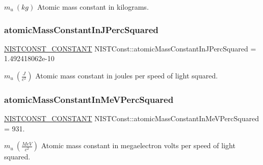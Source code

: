 $m_u \ (kg)$ Atomic mass constant in kilograms. \mbox{\label{group___n_i_s_t_const-_atomic_mass_constant_ga2e051baa0d89927080288e2289ac0346}} 
\subsubsection{\texorpdfstring{atomic\+Mass\+Constant\+In\+J\+Perc\+Squared}{atomicMassConstantInJPercSquared}}
{\footnotesize\ttfamily \mbox{\hyperlink{_n_i_s_t_const_8hpp_a2b0fc1d7452373f816175dd86ce26729}{N\+I\+S\+T\+C\+O\+N\+S\+T\+\_\+\+C\+O\+N\+S\+T\+A\+NT}} N\+I\+S\+T\+Const\+::atomic\+Mass\+Constant\+In\+J\+Perc\+Squared = 1.\+492418062e-\/10}

$m_u \ (\frac{J}{c^2})$ Atomic mass constant in joules per speed of light squared. \mbox{\label{group___n_i_s_t_const-_atomic_mass_constant_ga050dd5d7f3c4ee37a9ff7456ce82f8d2}} 
\subsubsection{\texorpdfstring{atomic\+Mass\+Constant\+In\+Me\+V\+Perc\+Squared}{atomicMassConstantInMeVPercSquared}}
{\footnotesize\ttfamily \mbox{\hyperlink{_n_i_s_t_const_8hpp_a2b0fc1d7452373f816175dd86ce26729}{N\+I\+S\+T\+C\+O\+N\+S\+T\+\_\+\+C\+O\+N\+S\+T\+A\+NT}} N\+I\+S\+T\+Const\+::atomic\+Mass\+Constant\+In\+Me\+V\+Perc\+Squared = 931.}

$m_u \ (\frac{MeV}{c^2})$ Atomic mass constant in megaelectron volts per speed of light squared. 